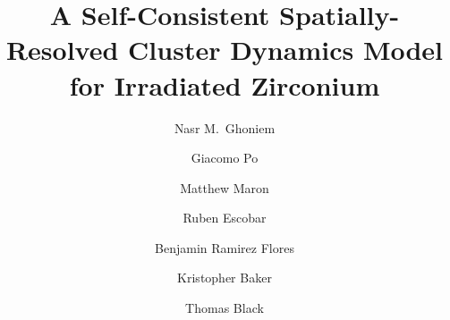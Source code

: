 \documentclass[preprint,3p,times]{elsarticle}
\begin{document}

\begin{frontmatter}

\title{A Self-Consistent Spatially-Resolved Cluster Dynamics Model for
       Irradiated Zirconium}

\author[ucla]{Nasr M.\ Ghoniem}
\author[miami]{Giacomo Po}
\author[miami]{Matthew Maron}
\author[miami]{Ruben Escobar}
\author[kapl]{Benjamin Ramirez Flores}
\author[kapl]{Kristopher Baker}
\author[bettis]{Thomas Black}


\address[ucla]{Department of Mechanical and Aerospace Engineering,
  University of California Los Angeles, Los Angeles, CA 90095, USA}
\address[miami]{Department of Mechanical and Aerospace Engineering,
  University of Miami, Coral Gables, FL 33146, USA}
\address[kapl]{Knolls Atomic Power Laboratory, Fluor Marine Propulsion, LLC,
  Niskayuna, NY 12309, USA}
\address[bettis]{Bettis Atomic Power Laboratory, Fluor Marine Propulsion, LLC,
  West Mifflin, PA 15122, USA}



\end{frontmatter}

\setcounter{tocdepth}{2}
\tableofcontents
\clearpage













\appendix
\setcounter{table}{0}
\setcounter{figure}{0}

\end{document}
